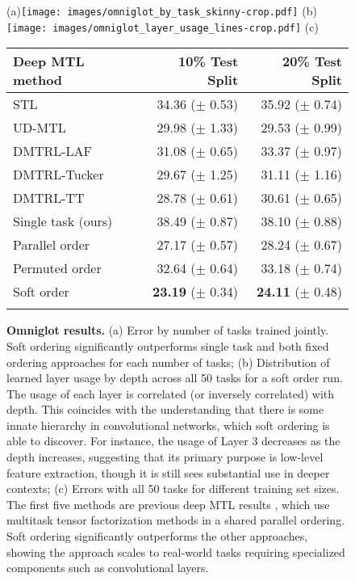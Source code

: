 \documentclass{article}
\theoremstyle{definition}
\theoremstyle{remark}
\begin{document}
\begin{figure}[h]
\footnotesize
\begin{center}
\begin{minipage}{.55\textwidth}
\vspace{0pt}
\centering
(a)\texttt{[image: images/omniglot\_by\_task\_skinny-crop.pdf]}
\hspace{3pt}(b)\texttt{[image: images/omniglot\_layer\_usage\_lines-crop.pdf]}
\hspace{1pt}(c)
\end{minipage}%
\begin{minipage}{.45\textwidth}
\vspace{0pt}
\centering
\scriptsize
\begin{tabular}{lrr}
    \toprule
    Deep MTL method     & 10\% Test Split & 20\% Test Split \\
    \midrule
    STL & 34.36 ($\pm$ 0.53) & 35.92 ($\pm$ 0.74) \\
    UD-MTL & 29.98 ($\pm$ 1.33) & 29.53 ($\pm$ 0.99) \\
    DMTRL-LAF & 31.08 ($\pm$ 0.65) & 33.37 ($\pm$ 0.97) \\
    DMTRL-Tucker & 29.67 ($\pm$ 1.25) & 31.11 ($\pm$ 1.16) \\
    DMTRL-TT & 28.78 ($\pm$ 0.61) & 30.61 ($\pm$ 0.65)\\
    \midrule
    Single task (ours) & 38.49 ($\pm$ 0.87) & 38.10 ($\pm$ 0.88) \\
    Parallel order & 27.17 ($\pm$ 0.57) & 28.24 ($\pm$ 0.67) \\
    Permuted order & 32.64 ($\pm$ 0.64) & 33.18 ($\pm$ 0.74) \\
    Soft order & \textbf{23.19} ($\pm$ 0.34) & \textbf{24.11} ($\pm$ 0.48) \\
    \bottomrule\\
\end{tabular}
\end{minipage}
\end{center}
\caption{\textbf{Omniglot results.} 
(a) Error by number of tasks trained jointly. 
Soft ordering significantly outperforms single task and both fixed ordering approaches for each number of tasks;
(b) Distribution of learned layer usage by depth across all 50 tasks for a soft order run. 
The usage of each layer is correlated (or inversely correlated) with depth. 
This coincides with the understanding that there is some innate hierarchy in convolutional networks, which soft ordering is able to discover. 
For instance, the usage of Layer 3 decreases as the depth increases, suggesting that its primary purpose is low-level feature extraction, though it is still sees substantial use in deeper contexts;
(c) Errors with all 50 tasks for different training set sizes. 
The first five methods are previous deep MTL results \citep{Yang:2017}, which use multitask tensor factorization methods in a shared parallel ordering. 
Soft ordering significantly outperforms the other approaches, showing the approach scales to real-world tasks requiring specialized components such as convolutional layers. 
}
\label{fig:omniglot_results}
\end{figure}
\end{document}
